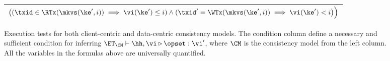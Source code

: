 \begin{figure}
\begin{tabular}{ l @{} r }
\multicolumn{2}{r}{\qquad %
$\big( (\txid \in \RTx(\mkvs(\ke', i)) \implies \vi(\ke') \leq i) \wedge (\txid' = \WTx(\mkvs(\ke',i)) \implies \vi(\ke') < i \big) \Big)$}\\
\hline
\end{tabular}
\caption{Execution tests for both client-centric and data-centric consistency models. 
The condition column define a necessary and sufficient condition for inferring $\ET_{\CM} \vdash \hh, \vi \triangleright \opset : \vi'$,  
where $\CM$ is the consistency model from the left column.
All the variables in the formulas above are universally quantified.}
\label{fig:execution.tests}
\label{fig:execution-tests}
\end{figure}

